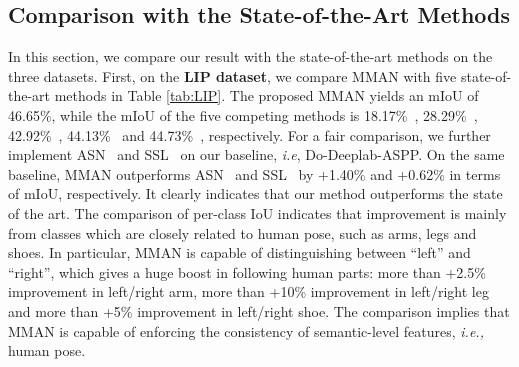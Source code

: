 \documentclass[runningheads]{llncs}
\begin{document}
\subsection{Comparison with the State-of-the-Art Methods}
In this section, we compare our result with the state-of-the-art methods on the three datasets. First, on the \textbf{LIP dataset}, we compare MMAN with five state-of-the-art methods in Table \ref{tab:LIP}. The proposed MMAN yields an mIoU of 46.65\%, while the mIoU of the five competing methods is 18.17\%~\cite{badrinarayanan2017segnet}, 28.29\%~\cite{long2015fully}, 42.92\%~\cite{chen2016attention}, 44.13\%~\cite{chen2016deeplab} and 44.73\%~\cite{gong2017look}, respectively. For a fair comparison, we further implement ASN~\cite{luc2016semantic} and SSL~\cite{gong2017look} on our baseline, \emph{i.e}, Do-Deeplab-ASPP. On the same baseline, MMAN outperforms ASN~\cite{luc2016semantic} and SSL~\cite{gong2017look} by +1.40\% and +0.62\% in terms of mIoU, respectively. It clearly indicates that our method outperforms  the state of the art. The comparison of per-class IoU indicates that improvement is mainly from classes which are closely related to human pose, such as arms, legs and shoes. In particular, MMAN is capable of distinguishing between ``left'' and ``right'', which gives a huge boost in following human parts: more than +2.5\% improvement in left/right arm, more than +10\% improvement in left/right leg and more than +5\% improvement in left/right shoe. The comparison implies that MMAN is capable of enforcing the consistency of semantic-level features, \emph{i.e.,} human pose.
\end{document}
